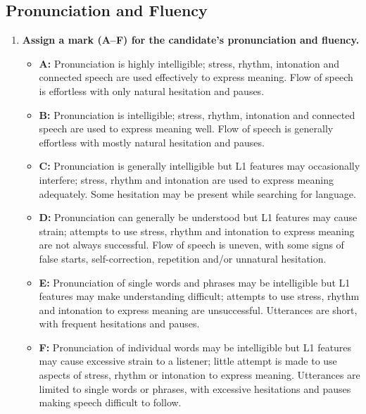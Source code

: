 \documentclass{report}
\begin{document}
\subsection*{Pronunciation and Fluency}
\begin{enumerate}
  \item \textbf{Assign a mark (A--F) for the candidate's pronunciation and fluency.}
  \begin{itemize}
    \item \textbf{A:} Pronunciation is highly intelligible; stress, rhythm, intonation and connected speech are used effectively to express meaning. Flow of speech is effortless with only natural hesitation and pauses.
    \item \textbf{B:} Pronunciation is intelligible; stress, rhythm, intonation and connected speech are used to express meaning well. Flow of speech is generally effortless with mostly natural hesitation and pauses.
    \item \textbf{C:} Pronunciation is generally intelligible but L1 features may occasionally interfere; stress, rhythm and intonation are used to express meaning adequately. Some hesitation may be present while searching for language.
    \item \textbf{D:} Pronunciation can generally be understood but L1 features may cause strain; attempts to use stress, rhythm and intonation to express meaning are not always successful. Flow of speech is uneven, with some signs of false starts, self-correction, repetition and/or unnatural hesitation.
    \item \textbf{E:} Pronunciation of single words and phrases may be intelligible but L1 features may make understanding difficult; attempts to use stress, rhythm and intonation to express meaning are unsuccessful. Utterances are short, with frequent hesitations and pauses.
    \item \textbf{F:} Pronunciation of individual words may be intelligible but L1 features may cause excessive strain to a listener; little attempt is made to use aspects of stress, rhythm or intonation to express meaning. Utterances are limited to single words or phrases, with excessive hesitations and pauses making speech difficult to follow.
  \end{itemize}
\end{enumerate}
\end{document}
